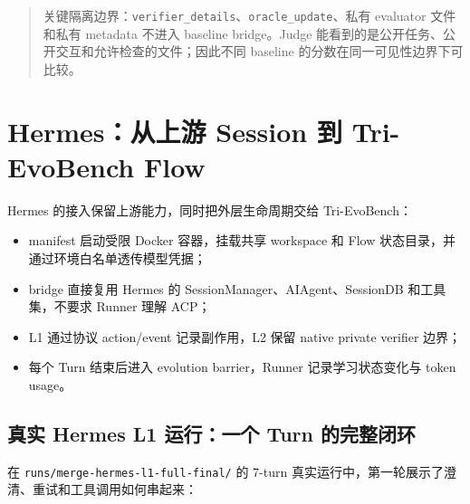 \documentclass[11pt,a4paper]{article}
\newenvironment{callout}{\begin{quote}\small\color{navy}}{\end{quote}}
\newcommand{\code}[1]{\texttt{#1}}
\begin{document}
\begin{callout}
关键隔离边界：\code{verifier\_details}、\code{oracle\_update}、私有 evaluator 文件和私有 metadata 不进入 baseline bridge。Judge 能看到的是公开任务、公开交互和允许检查的文件；因此不同 baseline 的分数在同一可见性边界下可比较。
\end{callout}

\section{Hermes：从上游 Session 到 Tri-EvoBench Flow}

Hermes 的接入保留上游能力，同时把外层生命周期交给 Tri-EvoBench：

\begin{itemize}
\item manifest 启动受限 Docker 容器，挂载共享 workspace 和 Flow 状态目录，并通过环境白名单透传模型凭据；
\item bridge 直接复用 Hermes 的 SessionManager、AIAgent、SessionDB 和工具集，不要求 Runner 理解 ACP；
\item L1 通过协议 action/event 记录副作用，L2 保留 native private verifier 边界；
\item 每个 Turn 结束后进入 evolution barrier，Runner 记录学习状态变化与 token usage。
\end{itemize}

\subsection*{真实 Hermes L1 运行：一个 Turn 的完整闭环}

在 \code{runs/merge-hermes-l1-full-final/} 的 7-turn 真实运行中，第一轮展示了澄清、重试和工具调用如何串起来：

\begin{center}
\end{center}
\end{document}
